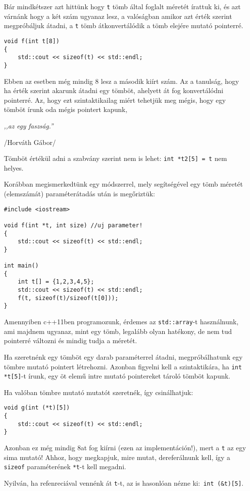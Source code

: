 \documentclass[a4paper,11.5pt]{article}
\begin{document}
	Bár mindkétszer azt hittünk hogy \texttt{t} tömb által foglalt méretét írattuk ki, és azt várnánk hogy a két szám ugyanaz lesz, a valóságban amikor azt érték szerint megpróbáljuk átadni, a \texttt{t} tömb átkonvertálódik a tömb elejére mutató pointerré.
	\begin{lstlisting}
void f(int t[8])
{
	std::cout << sizeof(t) << std::endl;
}
	\end{lstlisting}
	Ebben az esetben még mindig 8 lesz a második kiírt szám. Az a tanulság, hogy ha érték szerint akarunk átadni egy tömböt, ahelyett át fog konvertálódni pointerré. Az, hogy ezt szintaktikailag miért tehetjük meg mégis, hogy egy tömböt írunk oda mégis pointert kapunk, 
	\begin{center}
		\textit{,,az egy faszság.''}
		
		/Horváth Gábor/
	\end{center}
	\begin{note}
		Tömböt értékül adni a szabvány szerint nem is lehet: \texttt{int *t2[5] = t} nem helyes.
	\end{note}
	Korábban megismerkedtünk egy módszerrel, mely segítségével egy tömb méretét (elemszámát) paraméterátadás után is megőriztük:
	\begin{lstlisting}
#include <iostream>

void f(int *t, int size) //uj parameter!
{
	std::cout << sizeof(t) << std::endl;
}

int main()
{
	int t[] = {1,2,3,4,5};
	std::cout << sizeof(t) << std::endl;
	f(t, sizeof(t)/sizeof(t[0]));
}
	\end{lstlisting}
	\begin{note}
		Amennyiben c++11ben programozunk, érdemes az \texttt{std::array}-t használnunk, ami majdnem ugyanaz, mint egy tömb, legalább olyan hatékony, de nem tud pointerré változni és mindig tudja a méretét.
	\end{note}
	Ha szeretnénk egy tömböt egy darab paraméterrel átadni, megpróbálhatunk egy tömbre mutató pointert létrehozni. Azonban figyelni kell a szintaktikára, ha \texttt{int *t[5]}-t írunk, egy öt elemű intre mutató pointereket tároló tömböt kapunk.
	
	\medskip
	Ha valóban tömbre mutató mutatót szeretnék, így csinálhatjuk:
	\begin{lstlisting}
void g(int (*t)[5])
{
	std::cout << sizeof(t) << std::endl;
}
	\end{lstlisting}
	Azonban ez még mindig 8at fog kiírni (ezen az implementáción!), mert a \texttt{t} az egy sima mutató! Ahhoz, hogy megkapjuk, mire mutat, dereferálnunk kell, így a \texttt{sizeof} paraméterének \texttt{*t}-t kell megadni.
	\begin{note}
		Nyilván, ha refenreciával vennénk át \texttt{t}-t, az is hasonlóan nézne ki:\, \texttt{int (\&t)[5]}.
	\end{note}
	\medskip
	
\end{document}

